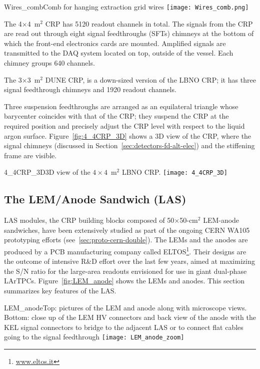 \begin{cdrfigure}{Wires_comb}{Comb for hanging extraction grid wires}
\texttt{[image: Wires\_comb.png]}
\end{cdrfigure}

The 4$\times$4~m$^2$ CRP has 5120 readout channels in total. The
signals from the CRP are read out through eight signal feedthroughs
(SFTs) chimneys
at the bottom of which the front-end electronics cards are mounted. Amplified signals
are transmitted to the DAQ system located on top, outside of the vessel.
Each chimney groups 640 channels. 

The 3$\times$3~m$^2$ DUNE CRP, is a down-sized version of the LBNO
CRP; it has three signal feedthrough chimneys and 1920 readout
channels.

Three suspension
feedthroughs are arranged as an equilateral triangle whose barycenter
coincides with that of the CRP; they suspend the CRP at the required
position and precisely adjust the CRP level with respect to the liquid
argon surface. Figure~\ref{fig:4_4CRP_3D} shows a 3D view of the CRP,
where the signal chimneys  (discussed in 
Section~\ref{sec:detectors-fd-alt-elec}) and the stiffening frame are
visible.
\begin{cdrfigure}{4_4CRP_3D}{3D view of the $4\times4$~m$^2$ LBNO CRP.}
\texttt{[image: 4\_4CRP\_3D]}  
\end{cdrfigure}


\subsection{The LEM/Anode Sandwich (LAS)}

LAS modules, the CRP building blocks composed of 50$\times$50-cm$^2$ LEM-anode 
sandwiches,  have been extensively studied as part of the ongoing CERN
WA105 prototyping efforts (see~\ref{sec:proto-cern-double}). The LEMs
and the anodes are produced by a PCB manufacturing company called
ELTOS\footnote{\url{www.eltos.it}}. Their designs are the outcome of
intensive R\&D effort over the last few years, aimed at maximizing the
S/N ratio for the large-area readouts envisioned for use in giant
dual-phase LArTPCs.  Figure~\ref{fig:LEM_anode} shows the LEMs and
anodes.  This section summarizes key features of the LAS.


\begin{cdrfigure}
{LEM_anode}{Top: pictures of the LEM and anode along with microscope
  views. Bottom: close up of the LEM HV connectors and back view of the anode 
with the KEL signal connectors to bridge to the adjacent LAS or to connect 
flat cables going to the signal feedthrough}
 \texttt{[image: LEM\_anode\_zoom]}  
 \end{cdrfigure}


